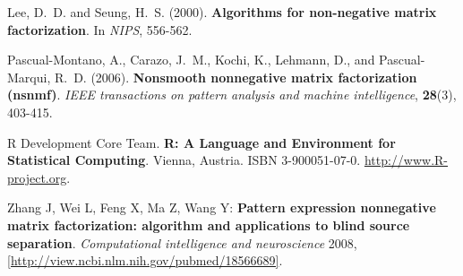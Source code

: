\documentclass[a4paper]{article}
\begin{document}
\begin{thebibliography}{}
 Lee, D.~D. and Seung, H.~S. (2000).
\textbf{Algorithms for non-negative matrix factorization}.
In {\it {NIPS}\/}, 556-562.

 Pascual-Montano, A., Carazo, J.~M., Kochi, K., Lehmann, D., and Pascual-Marqui, R.~D. (2006).
\textbf{Nonsmooth nonnegative matrix factorization (nsnmf)}.
{\em IEEE transactions on pattern analysis and machine intelligence\/}, {\bf 28}(3), 403-415.

 R Development Core Team.
\textbf{R: A Language and Environment for Statistical Computing}.
Vienna, Austria. ISBN 3-900051-07-0.
\url{http://www.R-project.org}.

Zhang J, Wei L, Feng X, Ma Z, Wang Y: 
\textbf{Pattern expression nonnegative matrix factorization: algorithm and applications to blind source separation}.
\emph{Computational intelligence and neuroscience} 2008,
\url{[http://view.ncbi.nlm.nih.gov/pubmed/18566689]}.


\end{thebibliography}
\end{document}
